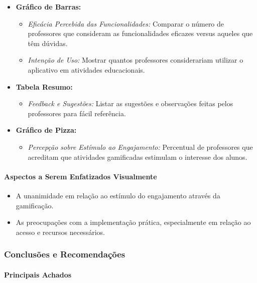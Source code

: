 \begin{itemize}
    \item \textbf{Gráfico de Barras:}
    \begin{itemize}
        \item \textit{Eficácia Percebida das Funcionalidades:} Comparar o número de professores que consideram as funcionalidades eficazes versus aqueles que têm dúvidas.
        \item \textit{Intenção de Uso:} Mostrar quantos professores considerariam utilizar o aplicativo em atividades educacionais.
    \end{itemize}
    \item \textbf{Tabela Resumo:}
    \begin{itemize}
        \item \textit{Feedback e Sugestões:} Listar as sugestões e observações feitas pelos professores para fácil referência.
    \end{itemize}
    \item \textbf{Gráfico de Pizza:}
    \begin{itemize}
        \item \textit{Percepção sobre Estímulo ao Engajamento:} Percentual de professores que acreditam que atividades gamificadas estimulam o interesse dos alunos.
    \end{itemize}
\end{itemize}

\paragraph{Aspectos a Serem Enfatizados Visualmente}

\begin{itemize}
    \item A unanimidade em relação ao estímulo do engajamento através da gamificação.
    \item As preocupações com a implementação prática, especialmente em relação ao acesso e recursos necessários.
\end{itemize}

\subsubsection{Conclusões e Recomendações}

\paragraph{Principais Achados}

